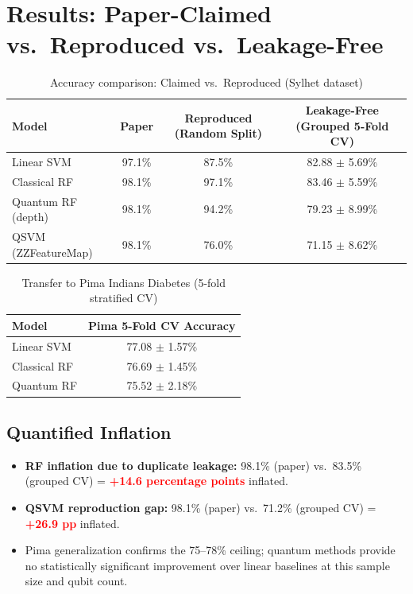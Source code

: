 \documentclass[12pt,a4paper]{article}
\begin{document}
\section{Results: Paper-Claimed vs.\ Reproduced vs.\ Leakage-Free}
\begin{table}[h!]
  \centering
  \caption{Accuracy comparison: Claimed vs.\ Reproduced (Sylhet dataset)}
  \begin{tabular}{lccc}
    \toprule
    \textbf{Model} & \textbf{Paper} & \textbf{Reproduced (Random Split)} & \textbf{Leakage-Free (Grouped 5-Fold CV)}\\
    \midrule
    Linear SVM          & 97.1\% & 87.5\% & 82.88 $\pm$ 5.69\%\\
    Classical RF        & 98.1\% & 97.1\% & 83.46 $\pm$ 5.59\%\\
    Quantum RF (depth)  & 98.1\% & 94.2\% & 79.23 $\pm$ 8.99\%\\
    QSVM (ZZFeatureMap) & 98.1\% & 76.0\% & 71.15 $\pm$ 8.62\%\\
    \bottomrule
  \end{tabular}
\end{table}

\begin{table}[h!]
  \centering
  \caption{Transfer to Pima Indians Diabetes (5-fold stratified CV)}
  \begin{tabular}{lc}
    \toprule
    \textbf{Model} & \textbf{Pima 5-Fold CV Accuracy}\\
    \midrule
    Linear SVM   & 77.08 $\pm$ 1.57\%\\
    Classical RF & 76.69 $\pm$ 1.45\%\\
    Quantum RF   & 75.52 $\pm$ 2.18\%\\
    \bottomrule
  \end{tabular}
\end{table}

\subsection{Quantified Inflation}
\begin{itemize}[leftmargin=*]
  \item \textbf{RF inflation due to duplicate leakage:} 98.1\% (paper) vs.\ 83.5\% (grouped CV) = \textcolor{red}{\textbf{+14.6 percentage points}} inflated.
  \item \textbf{QSVM reproduction gap:} 98.1\% (paper) vs.\ 71.2\% (grouped CV) = \textcolor{red}{\textbf{+26.9 pp}} inflated.
  \item Pima generalization confirms the 75--78\% ceiling; quantum methods provide no statistically significant improvement over linear baselines at this sample size and qubit count.
\end{itemize}
\end{document}
